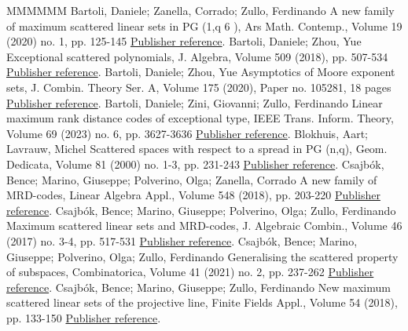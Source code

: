 \documentclass[11pt]{article}
\theoremstyle{definition}
\numberwithin{equation}{section}
\begin{document}
\begin{thebibliography}{MMMMMM}
 Bartoli, Daniele; Zanella, Corrado; Zullo, Ferdinando A new family of maximum scattered linear sets in  PG (1,q 6 ), Ars Math. Contemp., Volume 19 (2020) no. 1, pp. 125-145 \href{https://alco.centre-mersenne.org/articles/10.5802/alco.377/#MR4173668}{Publisher reference}.
 Bartoli, Daniele; Zhou, Yue Exceptional scattered polynomials, J. Algebra, Volume 509 (2018), pp. 507-534 \href{https://alco.centre-mersenne.org/articles/10.5802/alco.377/#bartoli2018exceptional}{Publisher reference}.
 Bartoli, Daniele; Zhou, Yue Asymptotics of Moore exponent sets, J. Combin. Theory Ser. A, Volume 175 (2020), Paper no. 105281, 18 pages \href{https://alco.centre-mersenne.org/articles/10.5802/alco.377/#BARTOLI2020105281}{Publisher reference}.
 Bartoli, Daniele; Zini, Giovanni; Zullo, Ferdinando Linear maximum rank distance codes of exceptional type, IEEE Trans. Inform. Theory, Volume 69 (2023) no. 6, pp. 3627-3636 \href{https://alco.centre-mersenne.org/articles/10.5802/alco.377/#bartoli2021linear}{Publisher reference}.
 Blokhuis, Aart; Lavrauw, Michel Scattered spaces with respect to a spread in  PG (n,q), Geom. Dedicata, Volume 81 (2000) no. 1-3, pp. 231-243 \href{https://alco.centre-mersenne.org/articles/10.5802/alco.377/#blokhuis2000scattered}{Publisher reference}.
 Csajbók, Bence; Marino, Giuseppe; Polverino, Olga; Zanella, Corrado A new family of MRD-codes, Linear Algebra Appl., Volume 548 (2018), pp. 203-220 \href{https://alco.centre-mersenne.org/articles/10.5802/alco.377/#csajbok2018new}{Publisher reference}.
 Csajbók, Bence; Marino, Giuseppe; Polverino, Olga; Zullo, Ferdinando Maximum scattered linear sets and MRD-codes, J. Algebraic Combin., Volume 46 (2017) no. 3-4, pp. 517-531 \href{https://alco.centre-mersenne.org/articles/10.5802/alco.377/#csajbok2017maximum}{Publisher reference}.
 Csajbók, Bence; Marino, Giuseppe; Polverino, Olga; Zullo, Ferdinando Generalising the scattered property of subspaces, Combinatorica, Volume 41 (2021) no. 2, pp. 237-262 \href{https://alco.centre-mersenne.org/articles/10.5802/alco.377/#csajbok2021generalising}{Publisher reference}.
 Csajbók, Bence; Marino, Giuseppe; Zullo, Ferdinando New maximum scattered linear sets of the projective line, Finite Fields Appl., Volume 54 (2018), pp. 133-150 \href{https://alco.centre-mersenne.org/articles/10.5802/alco.377/#csajbok2018new2}{Publisher reference}.

\end{thebibliography}
\end{document}
